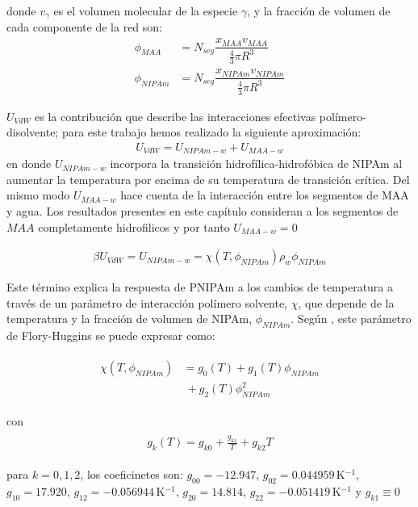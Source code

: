 \noindent donde $v_\gamma$  es el volumen molecular de la especie $\gamma$, y la fracci\'on de volumen de cada componente de la red son: 
%
%
\begin{align}
	\phi_{MAA}&=N_{seg}\dfrac{x_{MAA}v_{MAA}}{\frac{4}{3}\pi R^3}\\
	\phi_{NIPAm}&=N_{seg}\dfrac{x_{NIPAm}v_{NIPAm}}{\frac{4}{3}\pi R^3}
\end{align}



$U_{VdW}$ es la contribuci\'on que describe las interacciones efectivas pol\'imero-disolvente; para este trabajo hemos realizado la siguiente aproximaci\'on: 
\begin{align}
	U_{VdW} = U_{NIPAm-w} + U_{MAA-w}
\end{align}
\noindent en donde $U_{NIPAm-w}$ incorpora la transici\'on hidrofílica-hidrof\'obica de NIPAm al aumentar la temperatura por encima de su temperatura de transici\'on cr\'itica. 
Del mismo modo $U_{MAA-w}$ hace cuenta de la interacci\'on entre los segmentos de MAA y agua.
Los resultados presentes en este cap\'itulo consideran a los segmentos de $MAA$ completamente hidrofilicos y por tanto $U_{MAA-w} = 0$

\begin{align}
	\beta U_{VdW} = U_{NIPAm-w} = \chi (T, \phi_{NIPAm})\rho_w \phi_{NIPAm}
\end{align}


Este  t\'ermino explica la respuesta de PNIPAm a los cambios de temperatura a trav\'es de un par\'ametro de interacci\'on pol\'imero solvente, $\chi$, que depende de la temperatura y la fracci\'on de volumen de NIPAm, $\phi_{NIPAm}$.
Seg\'un  \citet{afroze2000}, este par\'ametro de Flory-Huggins se puede expresar como:
%
%


\begin{align}
	\begin{aligned}
		\chi (T, \phi_{NIPAm}) &=g_0(T) +g_1(T)\phi_{NIPAm} \\
		&~+ g_2(T)\phi_{NIPAm}^2
	\end{aligned}
\end{align}

\noindent con
%
%
\begin{align}
	\begin{aligned} 
		g_k(T)=g_{k0} + \frac{g_{k1}}{T} + g_{k2}T
	\end{aligned}
\end{align}


\noindent para  $k=0,1,2$, los coeficinetes son: $g_{00}= -12.947$, $g_{02}=0.044959\,$K$^{-1}$, $g_{10}= 17.920$, $g_{12}= -0.056944$\,K$^{-1}$, $g_{20}= 14.814$, $g_{22}= -0.051419$\,K$^{-1}$  y $g_{k1}\equiv 0$ \cite{afroze2000}




